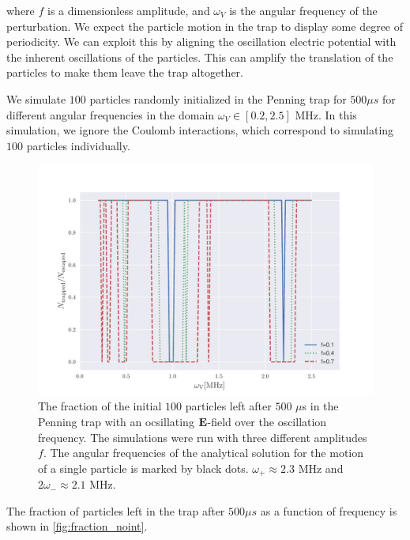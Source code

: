 where $f$ is a dimensionless amplitude, and $\omega_V$ is the angular frequency of the perturbation.
We expect the particle motion in the trap to display some degree of periodicity. We can exploit this
by aligning the oscillation electric potential with the inherent oscillations of the particles. This can amplify the translation of the particles to make them leave the trap altogether.

    We simulate $100$ particles randomly initialized in the Penning trap for $500 \mu s$ for
different angular frequencies in the domain $\omega_V \in [0.2, 2.5]$ MHz. In this simulation, we ignore the Coulomb interactions, which
correspond to simulating $100$ particles individually.

\begin{figure}
\centering
\includegraphics[scale = 0.7]{../figures/fraction_left_omega.pdf}
\caption{The fraction of the initial $100$ particles left after $500$ $\mu$s in the Penning trap with an ocsillating $\bold{E}$-field over
the oscillation frequency. The simulations were run with three different amplitudes $f$. The angular frequencies of the analytical solution for the motion
of a single particle is marked by black dots. $\omega_{+} \approx 2.3$ MHz and $2\omega_{-} \approx 2.1$ MHz.}
\label{fig:fraction_noint}
\end{figure}

The fraction of particles left
in the trap after $500 \mu s$ as a function of frequency is shown in \autoref{fig:fraction_noint}.

